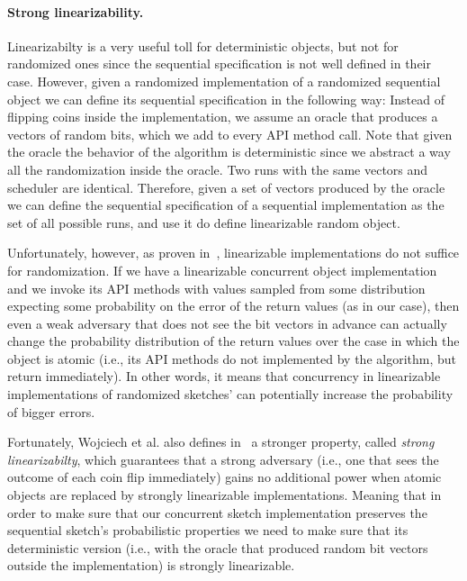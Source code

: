 
\paragraph{Strong linearizability.}

Linearizabilty is a very useful toll for deterministic objects,
but not for randomized ones since the sequential
specification is not well defined in their case.
However, given a randomized implementation of a randomized
sequential object we can define its sequential specification in
the following way:
Instead of flipping coins inside the implementation, we assume an
oracle that produces a vectors of random bits, which we add to
every API method call.
Note that given the oracle the behavior of the algorithm is
deterministic since we abstract a way all the randomization
inside the oracle.
Two runs with the same vectors and scheduler are identical. 
Therefore, given a set of vectors produced by the oracle we can
define the sequential specification of a sequential
implementation as the set of all possible runs, and use it do
define linearizable random object.

Unfortunately, however, as proven in~\cite{Wojciech},
linearizable implementations do not suffice for randomization.
If we have a linearizable concurrent object implementation and
we invoke its API methods with values sampled from some
distribution expecting some probability on the error of the
return values (as in our case), then even a weak adversary that
does not see the bit vectors in advance can actually change the
probability distribution of the return values over the case in
which the object is atomic (i.e., its API methods do not
implemented by the algorithm, but return immediately).
In other words, it means that concurrency in linearizable
implementations of randomized sketches' can potentially increase
the probability of bigger errors.

Fortunately, Wojciech et al. also defines in~\cite{Wojciech} a
stronger property, called \emph{strong linearizabilty}, which
guarantees that a strong adversary (i.e., one that sees the
outcome of each coin flip immediately) gains no additional power
when atomic objects are replaced by strongly linearizable
implementations.
Meaning that in order to make sure that our concurrent sketch
implementation preserves the sequential sketch's probabilistic
properties we need to make sure that its deterministic version
(i.e., with the oracle that produced random bit vectors outside
the implementation) is strongly linearizable.

